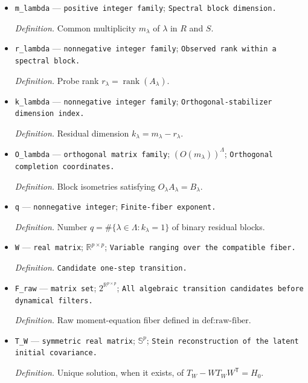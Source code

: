 \documentclass{article}
\begin{document}
\begin{itemize}
  \par\smallskip\noindent\emph{Definition.} Block probes \(B_\lambda=Q_\lambda^{\mathsf T}H_1^{-1/2}[d_1,d_2]\).
  \item \texttt{m\_\allowbreak{}lambda} --- \texttt{positive integer family}; \texttt{Spectral block dimension.}
  \par\smallskip\noindent\emph{Definition.} Common multiplicity \(m_\lambda\) of \(\lambda\) in \(R\) and \(S\).
  \item \texttt{r\_\allowbreak{}lambda} --- \texttt{nonnegative integer family}; \texttt{Observed rank within a spectral block.}
  \par\smallskip\noindent\emph{Definition.} Probe rank \(r_\lambda=\operatorname{rank}(A_\lambda)\).
  \item \texttt{k\_\allowbreak{}lambda} --- \texttt{nonnegative integer family}; \texttt{Orthogonal-\allowbreak{}stabilizer dimension index.}
  \par\smallskip\noindent\emph{Definition.} Residual dimension \(k_\lambda=m_\lambda-r_\lambda\).
  \item \texttt{O\_\allowbreak{}lambda} --- \texttt{orthogonal matrix family}; \((O(m_\lambda))^{\Lambda}\); \texttt{Orthogonal completion coordinates.}
  \par\smallskip\noindent\emph{Definition.} Block isometries satisfying \(O_\lambda A_\lambda=B_\lambda\).
  \item \texttt{q} --- \texttt{nonnegative integer}; \texttt{Finite-\allowbreak{}fiber exponent.}
  \par\smallskip\noindent\emph{Definition.} Number \(q=\#\{\lambda\in\Lambda:k_\lambda=1\}\) of binary residual blocks.
  \item \texttt{W} --- \texttt{real matrix}; \(\mathbb R^{p\times p}\); \texttt{Variable ranging over the compatible fiber.}
  \par\smallskip\noindent\emph{Definition.} \texttt{Candidate one-\allowbreak{}step transition.}
  \item \texttt{F\_\allowbreak{}raw} --- \texttt{matrix set}; \(2^{\mathbb R^{p\times p}}\); \texttt{All algebraic transition candidates before dynamical filters.}
  \par\smallskip\noindent\emph{Definition.} Raw moment-equation fiber defined in \(\text{def:raw-fiber}\).
  \item \texttt{T\_\allowbreak{}W} --- \texttt{symmetric real matrix}; \(\mathbb S^p\); \texttt{Stein reconstruction of the latent initial covariance.}
  \par\smallskip\noindent\emph{Definition.} Unique solution, when it exists, of \(T_W-WT_WW^{\mathsf T}=H_0\).

\end{itemize}
\end{document}
